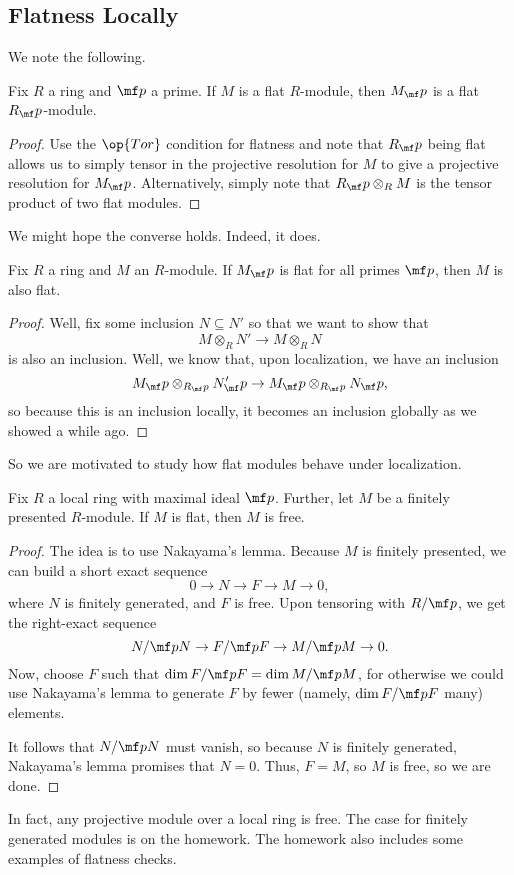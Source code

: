 \subsection{Flatness Locally}
We note the following.
\begin{lemma}
	Fix $R$ a ring and $\mf p$ a prime. If $M$ is a flat $R$-module, then $M_\mf p$ is a flat $R_\mf p$-module.
\end{lemma}
\begin{proof}
	Use the $\op{Tor}$ condition for flatness and note that $R_\mf p$ being flat allows us to simply tensor in the projective resolution for $M$ to give a projective resolution for $M_\mf p$. Alternatively, simply note that $R_\mf p\otimes_RM$ is the tensor product of two flat modules.
\end{proof}
We might hope the converse holds. Indeed, it does.
\begin{proposition}
	Fix $R$ a ring and $M$ an $R$-module. If $M_\mf p$ is flat for all primes $\mf p$, then $M$ is also flat.
\end{proposition}
\begin{proof}
	Well, fix some inclusion $N\subseteq N'$ so that we want to show that
	\[M\otimes_R N'\to M\otimes_RN\]
	is also an inclusion. Well, we know that, upon localization, we have an inclusion
	\[M_\mf p\otimes_{R_\mf p}N'_\mf p\to M_\mf p\otimes_{R_\mf p}N_\mf p,\]
	so because this is an inclusion locally, it becomes an inclusion globally as we showed a while ago.
\end{proof}
So we are motivated to study how flat modules behave under localization.
\begin{prop}
	Fix $R$ a local ring with maximal ideal $\mf p$. Further, let $M$ be a finitely presented $R$-module. If $M$ is flat, then $M$ is free.
\end{prop}
\begin{proof}
	The idea is to use Nakayama's lemma. Because $M$ is finitely presented, we can build a short exact sequence
	\[0\to N\to F\to M\to 0,\]
	where $N$ is finitely generated, and $F$ is free. Upon tensoring with $R/\mf p$, we get the right-exact sequence
	\[N/\mf pN\to F/\mf pF\to M/\mf pM\to 0.\]
	Now, choose $F$ such that $\dim F/\mf pF=\dim M/\mf pM$, for otherwise we could use Nakayama's lemma to generate $F$ by fewer (namely, $\dim F/\mf pF$ many) elements.
	
	It follows that $N/\mf pN$ must vanish, so because $N$ is finitely generated, Nakayama's lemma promises that $N=0$. Thus, $F=M$, so $M$ is free, so we are done.
\end{proof}
\begin{remark}
	In fact, any projective module over a local ring is free. The case for finitely generated modules is on the homework. The homework also includes some examples of flatness checks.
\end{remark}

